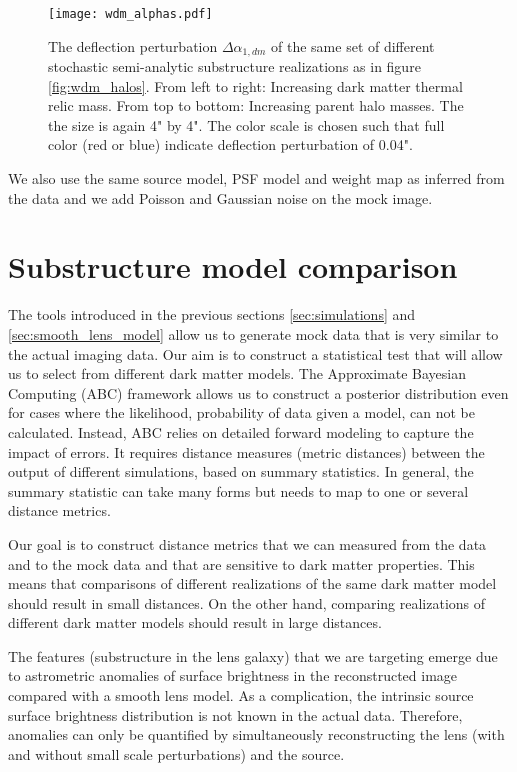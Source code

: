 \documentclass[a4paper,11pt]{article}
\begin{document}
\begin{figure*}
  \centering
  \texttt{[image: wdm\_alphas.pdf]}
  \caption{The deflection perturbation $\Delta \alpha_{1, dm}$ of the same set of different stochastic semi-analytic substructure realizations as in figure \ref{fig:wdm_halos}. From left to right: Increasing dark matter thermal relic mass. From top to bottom: Increasing parent halo masses. The the size is again 4" by 4". The color scale is chosen such that full color (red or blue) indicate deflection perturbation of 0.04".}
  \label{fig:wdm_alphas}
\end{figure*}

We also use the same source model, PSF model and weight map as inferred from the data and we add Poisson and Gaussian noise on the mock image.


\section{Substructure model comparison} \label{sec:model_comparison}

The tools introduced in the previous sections \ref{sec:simulations} and \ref{sec:smooth_lens_model} allow us to generate mock data that is very similar to the actual imaging data. Our aim is to construct a statistical test that will allow us to select from different dark matter models. The Approximate Bayesian Computing (ABC) \citep[][]{Turner:2012p14944, Liepe:2014p14925, Akeret:2015p15286} framework allows us to construct a posterior distribution even for cases where the likelihood, probability of data given a model, can not be calculated. Instead, ABC relies on detailed forward modeling to capture the impact of errors. It requires distance measures (metric distances) between the output of different simulations, based on summary statistics. In general, the summary statistic can take many forms but needs to map to one or several distance metrics.

Our goal is to construct distance metrics that we can measured from the data and to the mock data and that are sensitive to dark matter properties. This means that comparisons of different realizations of the same dark matter model should result in small distances. On the other hand, comparing realizations of different dark matter models should result in large distances.

The features (substructure in the lens galaxy) that we are targeting emerge due to astrometric anomalies of surface brightness in the reconstructed image compared with a smooth lens model. As a complication, the intrinsic source surface brightness distribution is not known in the actual data. Therefore, anomalies can only be quantified by simultaneously reconstructing the lens (with and without small scale perturbations) and the source.
\end{document}
